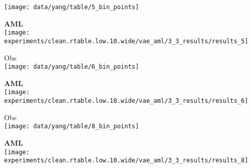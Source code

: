 {\begin{minipage}[t]{0.15\textwidth}
    \texttt{[image: data/yang/table/5\_bin\_points]}
\end{minipage}
\begin{minipage}[t]{0.15\textwidth}
    \vspace{0px}\centering
    {\bf\color{MPIIorange} AML}\\[-1px]
    \texttt{[image: experiments/clean.rtable.low.10.wide/vae\_aml/3\_3\_results/results\_5]}
\end{minipage}
\begin{minipage}[t]{0.15\textwidth}
    \vspace{0px}\centering
    Obs\\[-1px]
    \texttt{[image: data/yang/table/6\_bin\_points]}
\end{minipage}
\begin{minipage}[t]{0.15\textwidth}
    \vspace{0px}\centering
    {\bf\color{MPIIorange} AML}\\[-1px]
    \texttt{[image: experiments/clean.rtable.low.10.wide/vae\_aml/3\_3\_results/results\_6]}
\end{minipage}
\begin{minipage}[t]{0.15\textwidth}
    \vspace{0px}\centering
    Obs\\[-1px]
    \texttt{[image: data/yang/table/8\_bin\_points]}
\end{minipage}
\begin{minipage}[t]{0.15\textwidth}
	\vspace{0px}\centering
    {\bf\color{MPIIorange} AML}\\[-1px]
	\texttt{[image: experiments/clean.rtable.low.10.wide/vae\_aml/3\_3\_results/results\_8]}
\end{minipage}
}